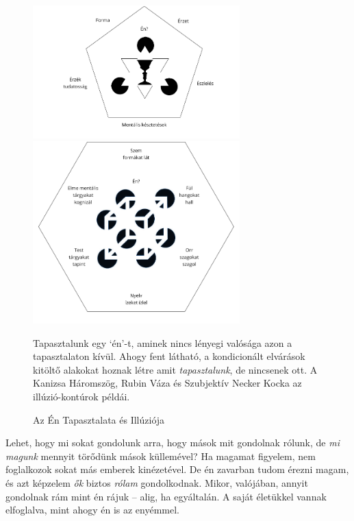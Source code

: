 \begin{figure}[h]
\caption{Az Én Tapasztalata és Illúziója}\label{fig-illusion-of-self}

\centering

\includegraphics[width=80mm]{./manuscript/tex/diagrams/khandhas-self-illusion-hu.pdf}

\bigskip

\includegraphics[width=80mm]{./manuscript/tex/diagrams/senses-self-illusion-hu.pdf}

\bigskip

\begin{minipage}{0.85\linewidth}
\centering\footnotesize
Tapasztalunk egy `én'-t, aminek nincs lényegi valósága azon a tapasztalaton kívül.
Ahogy fent látható, a kondicionált elvárások kitöltő alakokat hoznak létre
amit \emph{tapasztalunk}, de nincsenek ott.
A Kanizsa Háromszög, Rubin Váza és Szubjektív Necker Kocka az illúzió-kontúrok példái.
\end{minipage}

\end{figure}

\vfill\null
\clearpage
\normalpagelayout

Lehet, hogy mi sokat gondolunk arra, hogy mások mit gondolnak rólunk, de
\emph{mi magunk} mennyit törődünk mások küllemével? Ha magamat figyelem,
nem foglalkozok sokat más emberek kinézetével. De én zavarban tudom
érezni magam, és azt képzelem \emph{ők} biztos \emph{rólam}
gondolkodnak. Mikor, valójában, annyit gondolnak rám mint én rájuk --
alig, ha egyáltalán. A saját életükkel vannak elfoglalva, mint ahogy én
is az enyémmel.

